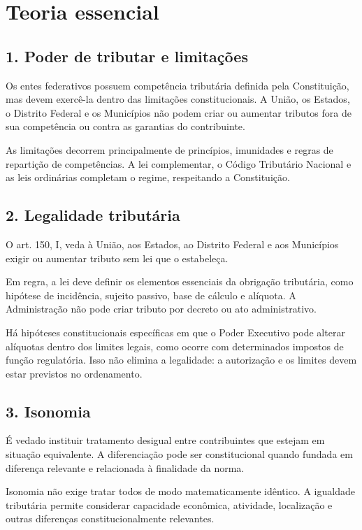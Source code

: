 \documentclass[11pt,a4paper]{article}
\begin{document}
\section*{Teoria essencial}

\subsection*{1. Poder de tributar e limitações}

Os entes federativos possuem competência tributária definida pela Constituição, mas devem exercê-la dentro das limitações constitucionais. A União, os Estados, o Distrito Federal e os Municípios não podem criar ou aumentar tributos fora de sua competência ou contra as garantias do contribuinte.

As limitações decorrem principalmente de princípios, imunidades e regras de repartição de competências. A lei complementar, o Código Tributário Nacional e as leis ordinárias completam o regime, respeitando a Constituição.

\subsection*{2. Legalidade tributária}

O art. 150, I, veda à União, aos Estados, ao Distrito Federal e aos Municípios exigir ou aumentar tributo sem lei que o estabeleça.

Em regra, a lei deve definir os elementos essenciais da obrigação tributária, como hipótese de incidência, sujeito passivo, base de cálculo e alíquota. A Administração não pode criar tributo por decreto ou ato administrativo.

Há hipóteses constitucionais específicas em que o Poder Executivo pode alterar alíquotas dentro dos limites legais, como ocorre com determinados impostos de função regulatória. Isso não elimina a legalidade: a autorização e os limites devem estar previstos no ordenamento.

\subsection*{3. Isonomia}

É vedado instituir tratamento desigual entre contribuintes que estejam em situação equivalente. A diferenciação pode ser constitucional quando fundada em diferença relevante e relacionada à finalidade da norma.

Isonomia não exige tratar todos de modo matematicamente idêntico. A igualdade tributária permite considerar capacidade econômica, atividade, localização e outras diferenças constitucionalmente relevantes.
\end{document}
